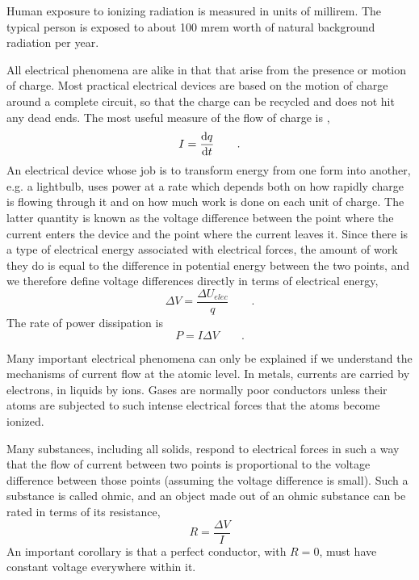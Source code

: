 	Human exposure to ionizing radiation is measured in units of
	millirem. The typical person is exposed to about 100 mrem
	worth of natural background radiation per year.

	All electrical phenomena are alike in that that arise from
	the presence or motion of charge. Most practical electrical
	devices are based on the motion of charge around a complete
	circuit, so that the charge can be recycled and does not hit
	any dead ends. The most useful measure of the flow of charge
	is , 
	\begin{equation*}
		I=\frac{\operatorname{d\!} q}{\operatorname{d\!} t} \qquad .
	\end{equation*}
	An electrical device whose job is to transform energy from
	one form into another, e.g. a lightbulb, uses power at a
	rate which depends both on how rapidly charge is flowing
	through it and on how much work is done on each unit of
	charge. The latter quantity is known as the voltage
	difference between the point where the current enters the
	device and the point where the current leaves it. Since
	there is a type of electrical energy associated with
	electrical forces, the amount of work they do is equal to
	the difference in potential energy between the two points,
	and we therefore define voltage differences directly in
	terms of electrical energy,
	\begin{equation*}
		 \Delta V=\frac{\Delta U_{elec}}{q} \qquad .
	\end{equation*}
	 The rate of power dissipation is
	\begin{equation*}
		P = I\Delta V \qquad .
	\end{equation*}
	
	Many important electrical phenomena can only be explained if
	we understand the mechanisms of current flow at the atomic
	level. In metals, currents are carried by electrons, in
	liquids by ions. Gases are normally poor conductors unless
	their atoms are subjected to such intense electrical forces
	that the atoms become ionized.
	
	Many substances, including all solids, respond to electrical
	forces in such a way that the flow of current between two
	points is proportional to the voltage difference between
	those points (assuming the voltage difference is small).
	Such a substance is called ohmic, and an
	object made out of an ohmic substance can be rated in terms
	of its resistance, 
	\begin{equation*}
		R = \frac{\Delta V}{I}
	\end{equation*}
	An important corollary is
	that a perfect conductor, with $R=0$, must have constant
	voltage everywhere within it.
	
